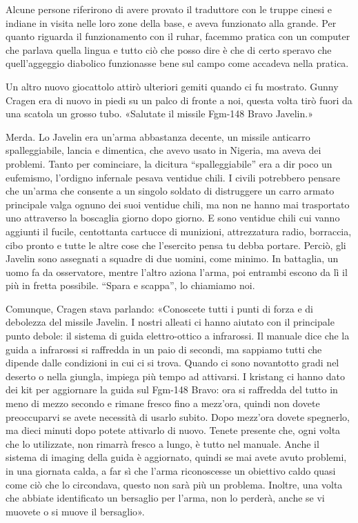 Alcune persone riferirono di avere provato il traduttore con le truppe
cinesi e indiane in visita nelle loro zone della base, e aveva
funzionato alla grande. Per quanto riguarda il funzionamento con il
ruhar, facemmo pratica con un computer che parlava quella lingua e tutto
ciò che posso dire è che di certo speravo che quell'aggeggio diabolico
funzionasse bene sul campo come accadeva nella pratica.

\hfill\break

Un altro nuovo giocattolo attirò ulteriori gemiti quando ci fu mostrato.
Gunny Cragen era di nuovo in piedi su un palco di fronte a noi, questa
volta tirò fuori da una scatola un grosso tubo. «Salutate il missile
Fgm-148 Bravo Javelin.»

Merda. Lo Javelin era un'arma abbastanza decente, un missile anticarro
spalleggiabile, lancia e dimentica, che avevo usato in Nigeria, ma aveva
dei problemi. Tanto per cominciare, la dicitura ``spalleggiabile'' era a
dir poco un eufemismo, l'ordigno infernale pesava ventidue chili. I
civili potrebbero pensare che un'arma che consente a un singolo soldato
di distruggere un carro armato principale valga ognuno dei suoi ventidue
chili, ma non ne hanno mai trasportato uno attraverso la boscaglia
giorno dopo giorno. E sono ventidue chili cui vanno aggiunti il fucile,
centottanta cartucce di munizioni, attrezzatura radio, borraccia, cibo
pronto e tutte le altre cose che l'esercito pensa tu debba portare.
Perciò, gli Javelin sono assegnati a squadre di due uomini, come minimo.
In battaglia, un uomo fa da osservatore, mentre l'altro aziona l'arma,
poi entrambi escono da lì il più in fretta possibile. ``Spara e
scappa'', lo chiamiamo noi.

Comunque, Cragen stava parlando: «Conoscete tutti i punti di forza e di
debolezza del missile Javelin. I nostri alleati ci hanno aiutato con il
principale punto debole: il sistema di guida elettro-ottico a
infrarossi. Il manuale dice che la guida a infrarossi si raffredda in un
paio di secondi, ma sappiamo tutti che dipende dalle condizioni in cui
ci si trova. Quando ci sono novantotto gradi nel deserto o nella
giungla, impiega più tempo ad attivarsi. I kristang ci hanno dato dei
kit per aggiornare la guida sul Fgm-148 Bravo: ora si raffredda del
tutto in meno di mezzo secondo e rimane fresco fino a mezz'ora, quindi
non dovete preoccuparvi se avete necessità di usarlo subito. Dopo
mezz'ora dovete spegnerlo, ma dieci minuti dopo potete attivarlo di
nuovo. Tenete presente che, ogni volta che lo utilizzate, non rimarrà
fresco a lungo, è tutto nel manuale. Anche il sistema di imaging della
guida è aggiornato, quindi se mai avete avuto problemi, in una giornata
calda, a far sì che l'arma riconoscesse un obiettivo caldo quasi come
ciò che lo circondava, questo non sarà più un problema. Inoltre, una
volta che abbiate identificato un bersaglio per l'arma, non lo perderà,
anche se vi muovete o si muove il bersaglio».


